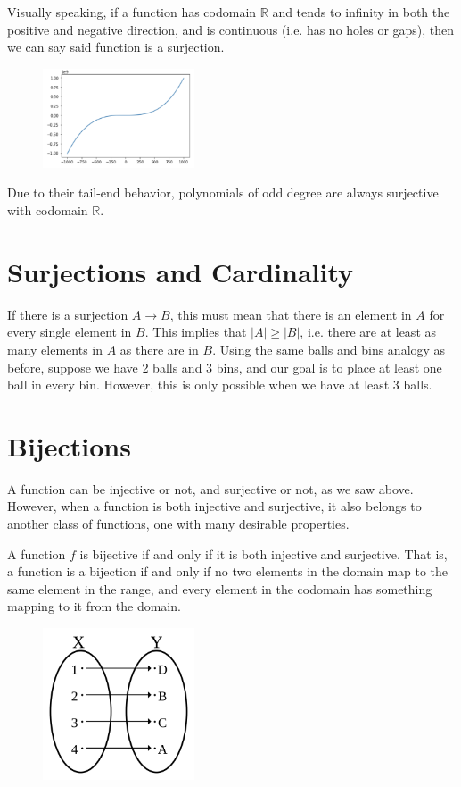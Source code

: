 \documentclass{article}
\begin{document}
Visually speaking, if a function has codomain $\mathbb{R}$ and tends to infinity in both the positive and negative direction, and is continuous (i.e. has no holes or gaps), then we can say said function is a surjection.

\begin{figure}[h]
\centering
\includegraphics[width=0.4\textwidth]{./images/surjection_infinity.png}
\label{fig:proven surjections}
\end{figure}
Due to their tail-end behavior, polynomials of odd degree are always surjective with codomain $\mathbb{R}$.

\section{Surjections and Cardinality}
If there is a surjection $A \rightarrow B$, this must mean that there is an 
element in $A$ for every single element in $B$. This implies that $\boxed{|A| \geq |B|}$,
i.e. there are at least as many elements in $A$ as there are in $B$. Using the same
balls and bins analogy as before, suppose we have 2 balls and 3 bins, and our goal 
is to place at least one ball in every bin. However, this is only possible when we have at least 3 balls.

\section{Bijections}
A function can be injective or not, and surjective or not, as we saw above. However,
when a function is both injective and surjective, it also belongs to another class of functions, one with many desirable properties.

A function $f$ is bijective if and only if it is both injective and surjective.
That is, a function is a bijection if and only if no two elements in the domain
map to the same element in the range, and every element in the codomain has something mapping to it from the domain.

\begin{figure}[h]
\centering
\includegraphics[width=0.4\textwidth]{./images/Bijection.png}
\label{fig:Bijection}
\end{figure}
\end{document}
